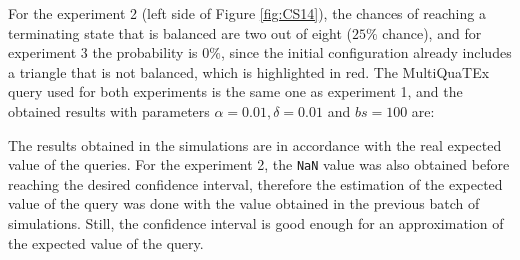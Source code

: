For the experiment 2 (left side of Figure \ref{fig:CS14}), the chances of reaching a terminating state that is balanced are two out of eight ($25\%$ chance), and for experiment 3 the probability is $0\%$, since the initial configuration already includes a triangle that is not balanced, which is highlighted in red. The MultiQuaTEx query used for both experiments is the same one as experiment 1, and the obtained results with parameters $\alpha = 0.01, \delta = 0.01$ and $bs = 100$ are: 
\begin{table}[H]
\centering
{}
\end{table}

The results obtained in the simulations are in accordance with the real expected value of the queries. For the experiment 2, the \texttt{NaN} value was also obtained before reaching the desired confidence interval, therefore the estimation of the expected value of the query was done with the value obtained in the previous batch of simulations. Still, the confidence interval is good enough for an approximation of the expected value of the query.














    